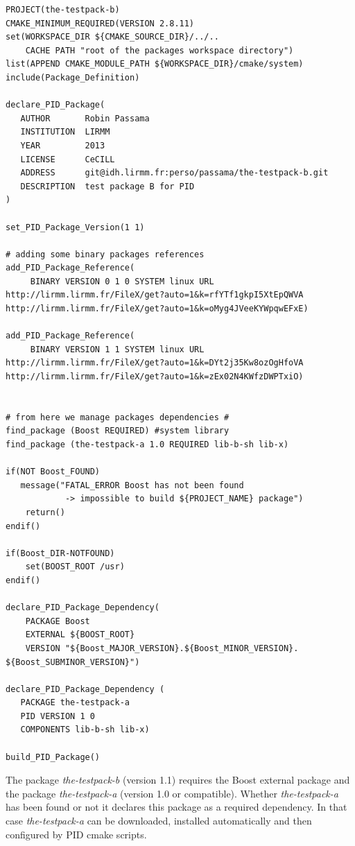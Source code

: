 \documentclass[12pt,a4paper]{article}
\begin{document}
\begin{verbatim}
PROJECT(the-testpack-b)
CMAKE_MINIMUM_REQUIRED(VERSION 2.8.11)
set(WORKSPACE_DIR ${CMAKE_SOURCE_DIR}/../.. 
	CACHE PATH "root of the packages workspace directory")
list(APPEND CMAKE_MODULE_PATH ${WORKSPACE_DIR}/cmake/system)
include(Package_Definition)

declare_PID_Package(	
   AUTHOR       Robin Passama 
   INSTITUTION  LIRMM 
   YEAR         2013 
   LICENSE      CeCILL
   ADDRESS      git@idh.lirmm.fr:perso/passama/the-testpack-b.git
   DESCRIPTION  test package B for PID
)

set_PID_Package_Version(1 1)

# adding some binary packages references
add_PID_Package_Reference(	
     BINARY VERSION 0 1 0 SYSTEM linux URL 	
http://lirmm.lirmm.fr/FileX/get?auto=1&k=rfYTf1gkpI5XtEpQWVA
http://lirmm.lirmm.fr/FileX/get?auto=1&k=oMyg4JVeeKYWpqwEFxE)

add_PID_Package_Reference(
     BINARY VERSION 1 1 SYSTEM linux URL 	
http://lirmm.lirmm.fr/FileX/get?auto=1&k=DYt2j35Kw8ozOgHfoVA
http://lirmm.lirmm.fr/FileX/get?auto=1&k=zEx02N4KWfzDWPTxiO)


# from here we manage packages dependencies #
find_package (Boost REQUIRED) #system library
find_package (the-testpack-a 1.0 REQUIRED lib-b-sh lib-x)

if(NOT Boost_FOUND)
   message("FATAL_ERROR Boost has not been found 
            -> impossible to build ${PROJECT_NAME} package")
	return()
endif()

if(Boost_DIR-NOTFOUND)
	set(BOOST_ROOT /usr)
endif()

declare_PID_Package_Dependency(
    PACKAGE Boost 
    EXTERNAL ${BOOST_ROOT} 
    VERSION "${Boost_MAJOR_VERSION}.${Boost_MINOR_VERSION}.
${Boost_SUBMINOR_VERSION}")

declare_PID_Package_Dependency (
   PACKAGE the-testpack-a
   PID VERSION 1 0 
   COMPONENTS lib-b-sh lib-x)

build_PID_Package()

\end{verbatim}

The package \textit{the-testpack-b} (version 1.1) requires the Boost external package and the package \textit{the-testpack-a} (version 1.0 or compatible). Whether \textit{the-testpack-a} has been found or not it declares this package as a required dependency. In that case \textit{the-testpack-a} can be downloaded, installed automatically and then configured by PID cmake scripts.
\end{document}
